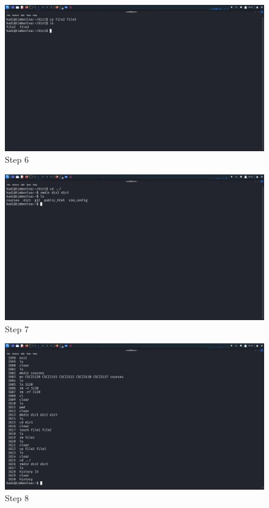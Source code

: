 \documentclass{article}
\numberwithin{equation}{subsection}
\begin{document}
	\begin{figure}[H]
		\caption{Step 6}
		\includegraphics[width=450pt]{images/e1qA/5.png}
	\end{figure}
	\begin{figure}[H]
		\caption{Step 7}
		\includegraphics[width=450pt]{images/e1qA/6.png}
	\end{figure}

	\begin{figure}[H]
		\caption{Step 8}
		\includegraphics[width=450pt]{images/e1qA/7.png}
	\end{figure}
\end{document}
